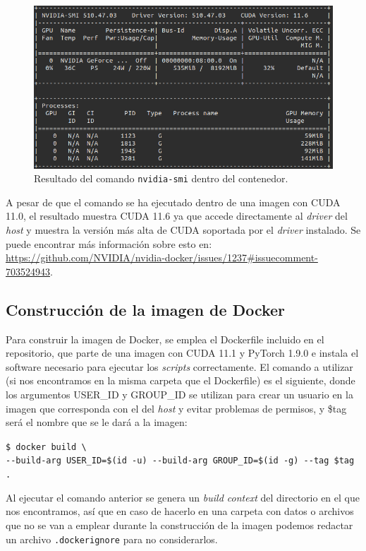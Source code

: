 \begin{figure}[H]
\centering
\includegraphics[width=1\linewidth]{imagenes/nvidia-smi.png} 
\captionsetup{width=1\linewidth}
\caption{Resultado del comando \texttt{nvidia-smi} dentro del contenedor.}
\label{fig:performer}
\end{figure}

A pesar de que el comando se ha ejecutado dentro de una imagen con CUDA 11.0, el resultado muestra CUDA 11.6 ya que accede directamente al \textit{driver} del \textit{host} y muestra la versión más alta de CUDA soportada por el \textit{driver} instalado. Se puede encontrar más información sobre esto en: \url{https://github.com/NVIDIA/nvidia-docker/issues/1237#issuecomment-703524943}.

\subsection{Construcción de la imagen de Docker}

Para construir la imagen de Docker, se emplea el Dockerfile incluido en el repositorio, que parte de una imagen con CUDA 11.1 y PyTorch 1.9.0 e instala el software necesario para ejecutar los \textit{scripts} correctamente. El comando a utilizar (si nos encontramos en la misma carpeta que el Dockerfile) es el siguiente, donde los argumentos USER{\_}ID y GROUP{\_}ID se utilizan para crear un usuario en la imagen que corresponda con el del \textit{host} y evitar problemas de permisos, y \$tag será el nombre que se le dará a la imagen:

\texttt{\$ docker build \textbackslash \\
{-}{-}build{-}arg USER{\_}ID=\$(id {-}u) {-}{-}build{-}arg GROUP{\_}ID=\$(id {-}g) {-}{-}tag \$tag .}

Al ejecutar el comando anterior se genera un \textit{build context} del directorio en el que nos encontramos, así que en caso de hacerlo en una carpeta con datos o archivos que no se van a emplear durante la construcción de la imagen podemos redactar un archivo \texttt{.dockerignore} para no considerarlos.

